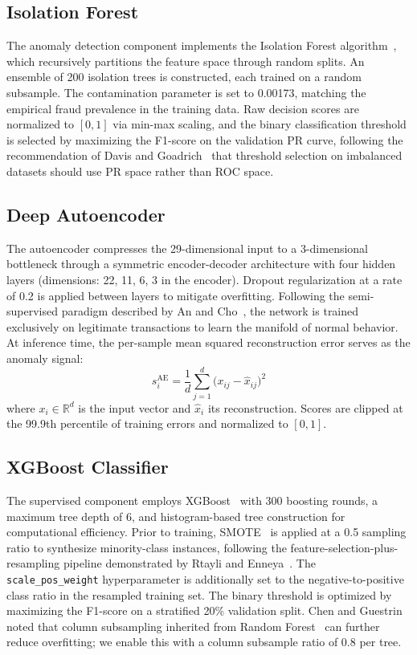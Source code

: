 \documentclass[conference,10pt]{IEEEtran}
\begin{document}
\subsection{Isolation Forest}
The anomaly detection component implements the Isolation Forest algorithm~\cite{liu2008isolation}, which recursively partitions the feature space through random splits. An ensemble of 200 isolation trees is constructed, each trained on a random subsample. The contamination parameter is set to 0.00173, matching the empirical fraud prevalence in the training data. Raw decision scores are normalized to $[0,1]$ via min-max scaling, and the binary classification threshold is selected by maximizing the F1-score on the validation PR curve, following the recommendation of Davis and Goadrich~\cite{davis2006relationship} that threshold selection on imbalanced datasets should use PR space rather than ROC space.

\subsection{Deep Autoencoder}
The autoencoder compresses the 29-dimensional input to a 3-dimensional bottleneck through a symmetric encoder-decoder architecture with four hidden layers (dimensions: 22, 11, 6, 3 in the encoder). Dropout regularization at a rate of 0.2 is applied between layers to mitigate overfitting. Following the semi-supervised paradigm described by An and Cho~\cite{an2015variational}, the network is trained exclusively on legitimate transactions to learn the manifold of normal behavior. At inference time, the per-sample mean squared reconstruction error serves as the anomaly signal:
\begin{equation}
  s_i^{\text{AE}} = \frac{1}{d} \sum_{j=1}^{d} \bigl(x_{ij} - \hat{x}_{ij}\bigr)^2 \label{eq:ae}
\end{equation}
where $x_i \in \mathbb{R}^d$ is the input vector and $\hat{x}_i$ its reconstruction. Scores are clipped at the 99.9th percentile of training errors and normalized to $[0,1]$.

\subsection{XGBoost Classifier}
The supervised component employs XGBoost~\cite{chen2016xgboost} with 300 boosting rounds, a maximum tree depth of 6, and histogram-based tree construction for computational efficiency. Prior to training, SMOTE~\cite{chawla2002smote} is applied at a 0.5 sampling ratio to synthesize minority-class instances, following the feature-selection-plus-resampling pipeline demonstrated by Rtayli and Enneya~\cite{rtayli2020enhanced}. The \texttt{scale\_pos\_weight} hyperparameter is additionally set to the negative-to-positive class ratio in the resampled training set. The binary threshold is optimized by maximizing the F1-score on a stratified 20\% validation split. Chen and Guestrin~\cite{chen2016xgboost} noted that column subsampling inherited from Random Forest~\cite{bhattacharyya2011data} can further reduce overfitting; we enable this with a column subsample ratio of 0.8 per tree.
\end{document}
